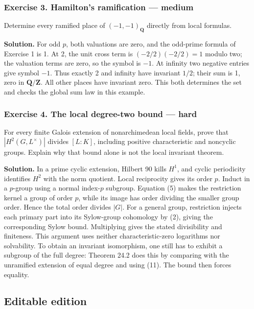 \documentclass[11pt,a4paper]{article}
\begin{document}
\subsubsection{Exercise 3. Hamilton's ramification ---
medium}\label{exercise-3.-hamiltons-ramification-medium}

Determine every ramified place of \((-1,-1)_{\mathbf Q}\) directly from
local formulas.

\textbf{Solution.} For odd \(p\), both valuations are zero, and the
odd-prime formula of Exercise 1 is 1. At 2, the unit cross term is
\((-2/2)(-2/2)=1\) modulo two; the valuation terms are zero, so the
symbol is \(-1\). At infinity two negative entries give symbol \(-1\).
Thus exactly 2 and infinity have invariant \(1/2\); their sum is 1, zero
in \(\mathbf Q/\mathbf Z\). All other places have invariant zero. This
both determines the set and checks the global sum law in this example.

\subsubsection{Exercise 4. The local degree-two bound ---
hard}\label{exercise-4.-the-local-degree-two-bound-hard}

For every finite Galois extension of nonarchimedean local fields, prove
that \(|H^2(G,L^\times)|\) divides \([L:K]\), including positive
characteristic and noncyclic groups. Explain why that bound alone is not
the local invariant theorem.

\textbf{Solution.} In a prime cyclic extension, Hilbert 90 kills
\(H^1\), and cyclic periodicity identifies \(H^2\) with the norm
quotient. Local reciprocity gives its order \(p\). Induct in a
\(p\)-group using a normal index-\(p\) subgroup. Equation (5) makes the
restriction kernel a group of order \(p\), while its image has order
dividing the smaller group order. Hence the total order divides \(|G|\).
For a general group, restriction injects each primary part into its
Sylow-group cohomology by (2), giving the corresponding Sylow bound.
Multiplying gives the stated divisibility and finiteness. This argument
uses neither characteristic-zero logarithms nor solvability. To obtain
an invariant isomorphism, one still has to exhibit a subgroup of the
full degree: Theorem 24.2 does this by comparing with the unramified
extension of equal degree and using (11). The bound then forces
equality.

\subsection{Editable edition}\label{editable-edition}
\end{document}
